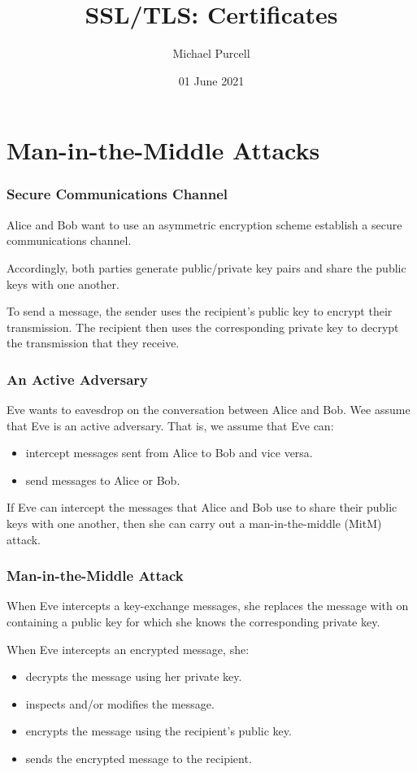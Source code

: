 \documentclass[aspectratio=169]{beamer}
\title{SSL/TLS: Certificates}
\author{Michael Purcell}
\date{01 June 2021}
\begin{document}
\begin{frame}[Triangle=siiorange]
\titlepage
\end{frame}

\section{Man-in-the-Middle Attacks}
\begin{frame}[Triangle=siiorange]
	\tocpage
\end{frame}

\begin{frame}[triangle=siiblue]
	\frametitle{Secure Communications Channel}
	Alice and Bob want to use an asymmetric encryption scheme establish a secure communications channel.
	
	\vfill
	
	Accordingly, both parties generate public/private key pairs and share the public keys with one another.
		
	\vfill
	
	To send a message, the sender uses the recipient's public key to encrypt their transmission. The recipient then uses the corresponding private key to decrypt the transmission that they receive.
\end{frame}

\begin{frame}[triangle=siiblue]
	\frametitle{An Active Adversary}
	Eve wants to eavesdrop on the conversation between Alice and Bob.
	Wee assume that Eve is an active adversary. That is, we assume that Eve can:
	\begin{itemize}
		\item intercept messages sent from Alice to Bob and vice versa.
		\item send messages to Alice or Bob. 
	\end{itemize}
	
	\vfill
	
	If Eve can intercept the messages that Alice and Bob use to share their public keys with one another, then she can carry out a man-in-the-middle (MitM) attack.
\end{frame}

\begin{frame}[triangle=siiblue]
	\frametitle{Man-in-the-Middle Attack}
	When Eve intercepts a key-exchange messages, she replaces the message with on containing a public key for which she knows the corresponding private key.
	
	\vfill
	
	When Eve intercepts an encrypted message, she:
	\begin{itemize}
		\item decrypts the message using her private key.
		\item inspects and/or modifies the message.
		\item encrypts the message using the recipient's public key.
		\item sends the encrypted message to the recipient.
	\end{itemize}
\end{frame}
\end{document}
